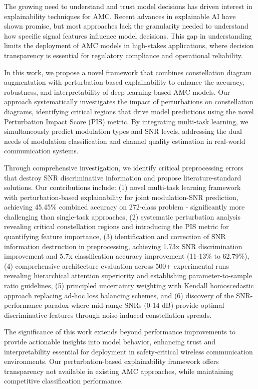 \documentclass{ELSP}
\begin{document}
The growing need to understand and trust model decisions has driven interest in explainability techniques for AMC. Recent advances in explainable AI have shown promise, but most approaches lack the granularity needed to understand how specific signal features influence model decisions. This gap in understanding limits the deployment of AMC models in high-stakes applications, where decision transparency is essential for regulatory compliance and operational reliability.

In this work, we propose a novel framework that combines constellation diagram augmentation with perturbation-based explainability to enhance the accuracy, robustness, and interpretability of deep learning-based AMC models. Our approach systematically investigates the impact of perturbations on constellation diagrams, identifying critical regions that drive model predictions using the novel Perturbation Impact Score (PIS) metric. By integrating multi-task learning, we simultaneously predict modulation types and SNR levels, addressing the dual needs of modulation classification and channel quality estimation in real-world communication systems.

Through comprehensive investigation, we identify critical preprocessing errors that destroy SNR discriminative information and propose literature-standard solutions. Our contributions include: (1) novel multi-task learning framework with perturbation-based explainability for joint modulation-SNR prediction, achieving 45.45\% combined accuracy on 272-class problem - significantly more challenging than single-task approaches, (2) systematic perturbation analysis revealing critical constellation regions and introducing the PIS metric for quantifying feature importance, (3) identification and correction of SNR information destruction in preprocessing, achieving 1.73x SNR discrimination improvement and 5.7x classification accuracy improvement (11-13\% to 62.79\%), (4) comprehensive architecture evaluation across 500+ experimental runs revealing hierarchical attention superiority and establishing parameter-to-sample ratio guidelines, (5) principled uncertainty weighting with Kendall homoscedastic approach replacing ad-hoc loss balancing schemes, and (6) discovery of the SNR-performance paradox where mid-range SNRs (0-14 dB) provide optimal discriminative features through noise-induced constellation spreads.

The significance of this work extends beyond performance improvements to provide actionable insights into model behavior, enhancing trust and interpretability essential for deployment in safety-critical wireless communication environments. Our perturbation-based explainability framework offers transparency not available in existing AMC approaches, while maintaining competitive classification performance.
\end{document}
